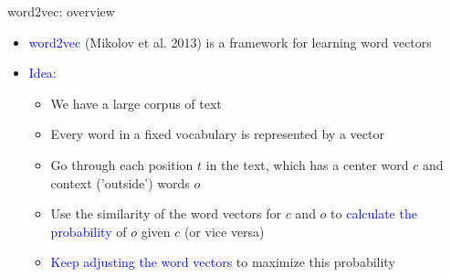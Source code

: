 \documentclass[usenames,dvipsnames,english]{beamer}
\begin{document}
\begin{frame}{word2vec: overview}
\begin{itemize}
\setlength{\itemsep}{1.2em}

    \item \textcolor{blue}{word2vec} (Mikolov et al. 2013) is a framework for learning word vectors
    \item \textcolor{blue}{Idea:}
    \begin{itemize}
    \vspace{5pt}
    \setlength{\itemsep}{1.2em}
        \item We have a large corpus of text
        \item Every word in a fixed vocabulary is represented by a vector
        \item Go through each position $t$ in the text, which has a center word $c$ and context ('outside') words $o$
        \item Use the similarity of the word vectors for $c$ and $o$ to \textcolor{blue}{calculate the probability} of $o$ given $c$ (or vice versa)
        \item \textcolor{blue}{Keep adjusting the word vectors} to maximize this probability
    \end{itemize}
    \end{itemize}
\end{frame}
\end{document}

